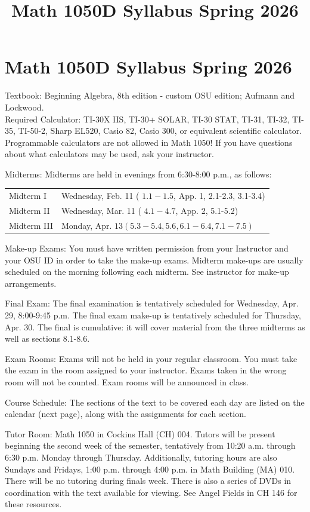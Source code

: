 \documentclass{ximera}
\title{Math 1050D Syllabus Spring 2026}
\begin{document}
\section*{Math 1050D Syllabus Spring 2026}
Textbook: Beginning Algebra, 8th edition - custom OSU edition; Aufmann and Lockwood.\\
Required Calculator: TI-30X IIS, TI-30+ SOLAR, TI-30 STAT, TI-31, TI-32, TI-35, TI-50-2, Sharp EL520, Casio 82, Casio 300, or equivalent scientific calculator. Programmable calculators are not allowed in Math 1050! If you have questions about what calculators may be used, ask your instructor.

Midterms: Midterms are held in evenings from 6:30-8:00 p.m., as follows:

\begin{center}
\begin{tabular}{ll}
Midterm I & Wednesday, Feb. 11 ( $1.1-1.5$, App. 1, 2.1-2.3, 3.1-3.4) \\
Midterm II & Wednesday, Mar. 11 ( $4.1-4.7$, App. 2, 5.1-5.2) \\
Midterm III & Monday, Apr. $13(5.3-5.4,5.6,6.1-6.4,7.1-7.5)$ \\
\end{tabular}
\end{center}

Make-up Exams: You must have written permission from your Instructor and your OSU ID in order to take the make-up exams. Midterm make-ups are usually scheduled on the morning following each midterm. See instructor for make-up arrangements.

Final Exam: The final examination is tentatively scheduled for Wednesday, Apr. 29, 8:00-9:45 p.m. The final exam make-up is tentatively scheduled for Thursday, Apr. 30. The final is cumulative: it will cover material from the three midterms as well as sections 8.1-8.6.

Exam Rooms: Exams will not be held in your regular classroom. You must take the exam in the room assigned to your instructor. Exams taken in the wrong room will not be counted. Exam rooms will be announced in class.

Course Schedule: The sections of the text to be covered each day are listed on the calendar (next page), along with the assignments for each section.

Tutor Room: Math 1050 in Cockins Hall (CH) 004. Tutors will be present beginning the second week of the semester, tentatively from 10:20 a.m. through 6:30 p.m. Monday through Thursday. Additionally, tutoring hours are also Sundays and Fridays, 1:00 p.m. through 4:00 p.m. in Math Building (MA) 010. There will be no tutoring during finals week. There is also a series of DVDs in coordination with the text available for viewing. See Angel Fields in CH 146 for these resources.
\end{document}
